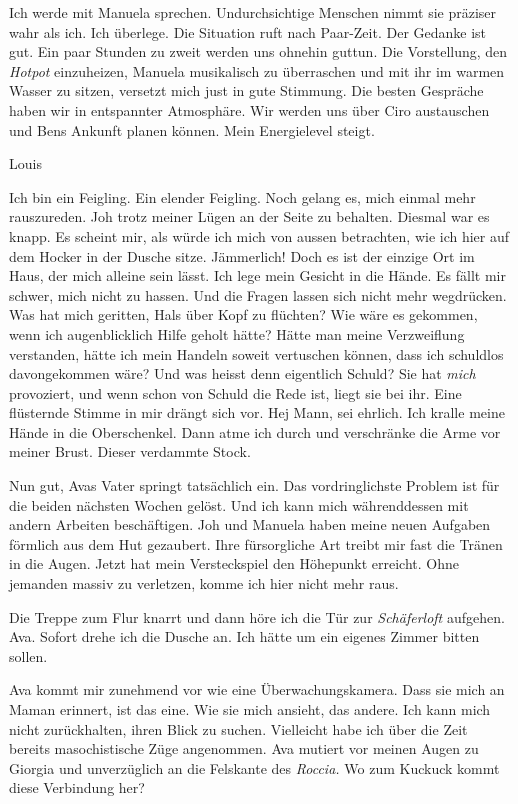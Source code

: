 Ich werde mit Manuela sprechen. Undurchsichtige Menschen nimmt sie
präziser wahr als ich. Ich überlege. Die Situation ruft nach Paar-Zeit.
Der Gedanke ist gut. Ein paar Stunden zu zweit werden uns ohnehin
guttun. Die Vorstellung, den \emph{Hotpot} einzuheizen, Manuela
musikalisch zu überraschen und mit ihr im warmen Wasser zu sitzen,
versetzt mich just in gute Stimmung. Die besten Gespräche haben wir in
entspannter Atmosphäre. Wir werden uns über Ciro austauschen und Bens
Ankunft planen können. Mein Energielevel steigt.

Louis

Ich bin ein Feigling. Ein elender Feigling. Noch gelang es, mich einmal
mehr rauszureden. Joh trotz meiner Lügen an der Seite zu behalten.
Diesmal war es knapp. Es scheint mir, als würde ich mich von aussen
betrachten, wie ich hier auf dem Hocker in der Dusche sitze. Jämmerlich!
Doch es ist der einzige Ort im Haus, der mich alleine sein lässt. Ich
lege mein Gesicht in die Hände. Es fällt mir schwer, mich nicht zu
hassen. Und die Fragen lassen sich nicht mehr wegdrücken. Was hat mich
geritten, Hals über Kopf zu flüchten? Wie wäre es gekommen, wenn ich
augenblicklich Hilfe geholt hätte? Hätte man meine Verzweiflung
verstanden, hätte ich mein Handeln soweit vertuschen können, dass ich
schuldlos davongekommen wäre? Und was heisst denn eigentlich Schuld? Sie
hat \emph{mich} provoziert, und wenn schon von Schuld die Rede ist,
liegt sie bei ihr. Eine flüsternde Stimme in mir drängt sich vor. Hej
Mann, sei ehrlich. Ich kralle meine Hände in die Oberschenkel. Dann atme
ich durch und verschränke die Arme vor meiner Brust. Dieser verdammte
Stock.

Nun gut, Avas Vater springt tatsächlich ein. Das vordringlichste Problem
ist für die beiden nächsten Wochen gelöst. Und ich kann mich
währenddessen mit andern Arbeiten beschäftigen. Joh und Manuela haben
meine neuen Aufgaben förmlich aus dem Hut gezaubert. Ihre fürsorgliche
Art treibt mir fast die Tränen in die Augen. Jetzt hat mein
Versteckspiel den Höhepunkt erreicht. Ohne jemanden massiv zu verletzen,
komme ich hier nicht mehr raus.

Die Treppe zum Flur knarrt und dann höre ich die Tür zur
\emph{Schäferloft} aufgehen. Ava. Sofort drehe ich die Dusche an. Ich
hätte um ein eigenes Zimmer bitten sollen.

Ava kommt mir zunehmend vor wie eine Überwachungskamera. Dass sie mich
an Maman erinnert, ist das eine. Wie sie mich ansieht, das andere. Ich
kann mich nicht zurückhalten, ihren Blick zu suchen. Vielleicht habe ich
über die Zeit bereits masochistische Züge angenommen. Ava mutiert vor
meinen Augen zu Giorgia und unverzüglich an die Felskante des
\emph{Roccia.} Wo zum Kuckuck kommt diese Verbindung her?

